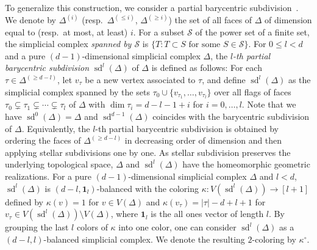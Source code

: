 \documentclass[11pt]{article}
\theoremstyle{definition}
\numberwithin{equation}{section}
\DeclareMathOperator{\sd}{sd}
\begin{document}
To generalize this construction, we consider a partial barycentric subdivision~\cite{AW}.
We denote by $\Delta^{(i)}$ (resp.~$\Delta^{(\leq i)}$, $\Delta^{(\geq i)}$) the set of all faces of $\Delta$ of dimension equal to (resp.~at most, at least) $i$.
For a subset $\mathcal{S}$ of the power set of a finite set, the simplicial complex \emph{spanned by $\mathcal{S}$} is $\{T:T\subset S \text{ for some } S \in \mathcal{S}\}$.
For $0 \leq l < d$ and a pure $(d-1)$-dimensional simplicial complex $\Delta$, the \emph{$l$-th partial barycentric subdivision} $\sd^l(\Delta)$ of $\Delta$ is defined as follows: For each $\tau \in \Delta^{(\geq d-l)}$, let $v_{\tau}$ be a new vertex associated to $\tau$, and define $\sd^l(\Delta)$ as the simplicial complex spanned by the sets $\tau_0 \cup \{v_{\tau_1}, \ldots, v_{\tau_l}\}$ over all flags of faces $\tau_0 \subsetneq \tau_1 \subsetneq \cdots \subsetneq \tau_l$ of $\Delta$ with $\dim \tau_i=d-l-1+i$ for $i=0,\ldots,l$.
Note that we have $\sd^0(\Delta)=\Delta$ and $\sd^{d-1}(\Delta)$ coincides with the barycentric subdivision of $\Delta$. 
Equivalently, the $l$-th partial barycentric subdivision is obtained by ordering the faces of $\Delta^{(\geq d-l)}$ in decreasing order of dimension and then applying stellar subdivisions one by one.
As stellar subdivision preserves the underlying topological space, $\Delta$ and $\sd^l(\Delta)$ have the homeomorphic geometric realizations.
For a pure $(d-1)$-dimensional simplicial complex $\Delta$ and $l<d$, $\sd^l(\Delta)$ is $(d-l,\bm{1}_l)$-balanced with the coloring $\kappa:V(\sd^l(\Delta)) \rightarrow [l+1]$ defined by $\kappa(v)=1$ for $v \in V(\Delta)$ and $\kappa(v_\tau)=|\tau|-d+l+1$ for $v_\tau \in V(\sd^l(\Delta)) \setminus V(\Delta)$, where $\bm{1}_{l}$ is the all ones vector of length $l$.
By grouping the last $l$ colors of $\kappa$ into one color, one can consider $\sd^l(\Delta)$ as a $(d-l,l)$-balanced simplicial complex. We denote the resulting $2$-coloring by $\kappa^\circ$.
\end{document}
